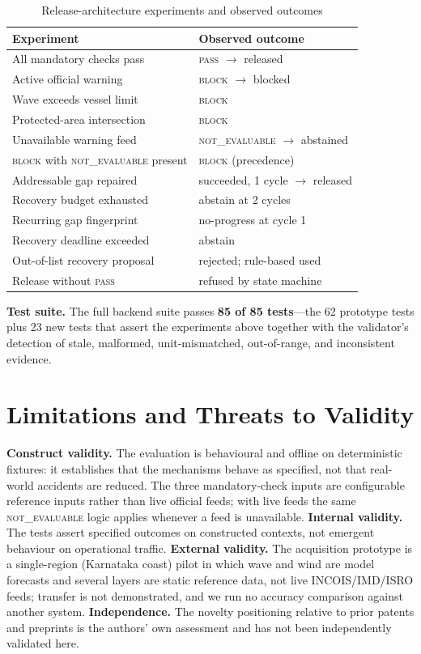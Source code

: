 \documentclass[conference]{IEEEtran}
\newcommand{\NE}{\textsc{not\_evaluable}}
\newcommand{\PASS}{\textsc{pass}}
\newcommand{\BLOCK}{\textsc{block}}
\begin{document}
\begin{table}[t]
\caption{Release-architecture experiments and observed outcomes}
\label{tab:exp}
\centering
\footnotesize
\begin{tabular}{@{}>{\raggedright\arraybackslash}p{4.7cm}@{\ }>{\raggedright\arraybackslash}p{3.0cm}@{}}
\toprule
\textbf{Experiment} & \textbf{Observed outcome} \\
\midrule
All mandatory checks pass & \PASS{} $\to$ released \\
Active official warning & \BLOCK{} $\to$ blocked \\
Wave exceeds vessel limit & \BLOCK{} \\
Protected-area intersection & \BLOCK{} \\
Unavailable warning feed & \NE{} $\to$ abstained \\
\BLOCK{} with \NE{} present & \BLOCK{} (precedence) \\
Addressable gap repaired & succeeded, 1 cycle $\to$ released \\
Recovery budget exhausted & abstain at 2 cycles \\
Recurring gap fingerprint & no-progress at cycle 1 \\
Recovery deadline exceeded & abstain \\
Out-of-list recovery proposal & rejected; rule-based used \\
Release without \PASS{} & refused by state machine \\
\bottomrule
\end{tabular}
\end{table}

\textbf{Test suite.} The full backend suite passes \textbf{85 of 85 tests}---the 62 prototype tests plus 23 new tests that assert the experiments above together with the validator's detection of stale, malformed, unit-mismatched, out-of-range, and inconsistent evidence.

\section{Limitations and Threats to Validity}
\textbf{Construct validity.} The evaluation is behavioural and offline on deterministic fixtures: it establishes that the mechanisms behave as specified, not that real-world accidents are reduced. The three mandatory-check inputs are configurable reference inputs rather than live official feeds; with live feeds the same \NE{} logic applies whenever a feed is unavailable. \textbf{Internal validity.} The tests assert specified outcomes on constructed contexts, not emergent behaviour on operational traffic. \textbf{External validity.} The acquisition prototype is a single-region (Karnataka coast) pilot in which wave and wind are model forecasts and several layers are static reference data, not live INCOIS/IMD/ISRO feeds; transfer is not demonstrated, and we run no accuracy comparison against another system. \textbf{Independence.} The novelty positioning relative to prior patents and preprints is the authors' own assessment and has not been independently validated here.
\end{document}
